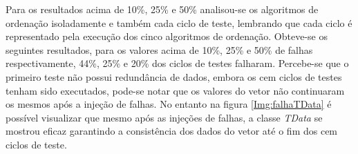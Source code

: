 

Para os resultados acima de 10\%, 25\% e 50\% analisou-se os algoritmos de ordenação isoladamente e também cada ciclo de teste, lembrando que cada ciclo é representado pela execução dos cinco algoritmos de ordenação. Obteve-se os seguintes resultados, para os valores acima de 10\%, 25\% e 50\% de falhas respectivamente, 44\%, 25\% e 20\% dos ciclos de testes falharam. Percebe-se que o primeiro teste não possui redundância de dados, embora os cem ciclos de testes tenham sido executados, pode-se notar que os valores do vetor não continuaram os mesmos após a injeção de falhas. No entanto na figura \ref{Img:falhaTData} é possível visualizar que mesmo após as injeções de falhas, a classe \textit{TData} se mostrou eficaz garantindo a consistência dos dados do vetor até o fim dos cem ciclos de teste.


